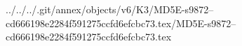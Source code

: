../../../.git/annex/objects/v6/K3/MD5E-s9872--cd666198e2284f591275ccfd6efcbc73.tex/MD5E-s9872--cd666198e2284f591275ccfd6efcbc73.tex